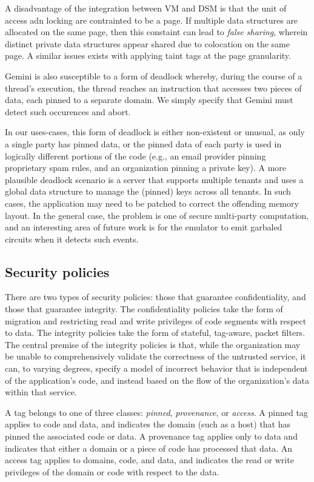 %
A disadvantage of the integration between VM and DSM is that the unit of access
adn locking are contrainted to be a page.
%
If multiple data structures are allocated on the same page, then this constaint
can lead to \emph{false sharing}, wherein distinct private data structures
appear shared due to colocation on the same page.
%
A similar issues exists with applying taint tags at the page granularity.


Gemini is also susceptible to a form of deadlock whereby, during the course of
a thread's execution, the thread reaches an instruction that accesses two
pieces of data, each pinned to a separate domain.
%
We simply specify that Gemini must detect such occurences and abort.


In our uses-cases, this form of deadlock is either non-existent or unusual, as
only a single party has pinned data, or the pinned data of each party is used 
in logically different portions of the code (e.g., an email provider pinning
proprietary spam rules, and an organization pinning a private key).
%
A more plausible deadlock scenario is a server that supports multiple tenants
and uses a global data structure to manage the (pinned) keys across all
tenants.
%
In such cases, the application may need to be patched to correct the offending
memory layout.
%
In the general case, the problem is one of secure multi-party computation, and
an interesting area of future work is for the emulator to emit garbaled
circuits when it detects such events.


\subsection{Security policies}
%
There are two types of security policies: those that guarantee
confidentiality, and those that guarantee integrity.
%
The confidentiality policies take the form of migration and restricting read
and write privileges of code segments with respect to data.
%
The integrity policies take the form of stateful, tag-aware, packet filters.
%
The central premise of the integrity policies is that, while the organization
may be unable to comprehensively validate the correctness of the untrusted
service, it can, to varying degrees, specify a model of incorrect behavior that
is independent of the application's code, and instead based on the flow of the
organization's data within that service. 


A tag belongs to one of three classes: \emph{pinned}, \emph{provenance},
or \emph{access}.
%
A pinned tag applies to code and data, and indicates the domain (such
as a host) that has pinned the associated code or data.
%
A provenance tag applies only to data and indicates that either a domain or a piece of
code has processed that data.
%
An access tag applies to domains, code, and data, and indicates the read or
write privileges of the domain or code with respect to the data.


